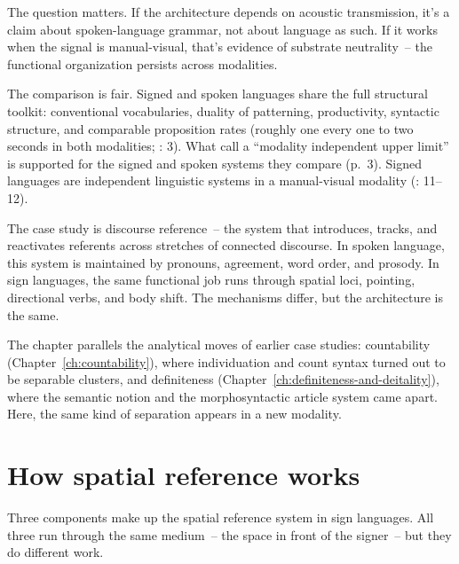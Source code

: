 The question matters. If the architecture depends on acoustic transmission, it's a claim about spoken-language grammar, not about language as such. If it works when the signal is manual-visual, that's evidence of substrate neutrality~-- the functional organization persists across modalities.

The comparison is fair. Signed and spoken languages share the full structural toolkit: conventional vocabularies, duality of patterning, productivity, syntactic structure, and comparable proposition rates (roughly one every one to two seconds in both modalities; \citealt{sandler2006}: 3). What \textcite{sandler2006} call a \enquote{modality independent upper limit} is supported for the signed and spoken systems they compare (p.~3). Signed languages are independent linguistic systems in a manual-visual modality (\citealt{meier2002}: 11--12).

The case study is discourse reference~-- the system that introduces, tracks, and reactivates referents across stretches of connected discourse. In spoken language, this system is maintained by pronouns, agreement, word order, and prosody. In sign languages, the same functional job runs through spatial loci, pointing, directional verbs, and body shift. The mechanisms differ, but the architecture is the same.

The chapter parallels the analytical moves of earlier case studies: countability (Chapter~\ref{ch:countability}), where individuation and count syntax turned out to be separable clusters, and definiteness (Chapter~\ref{ch:definiteness-and-deitality}), where the semantic notion and the morphosyntactic article system came apart. Here, the same kind of separation appears in a new modality.


\section{How spatial reference works}
\label{sec:sign:how}

Three components make up the spatial reference system in sign languages. All three run through the same medium~-- the space in front of the signer~-- but they do different work.

